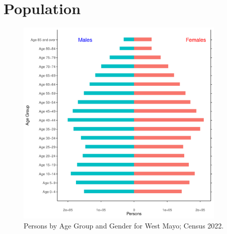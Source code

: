 \documentclass{article}
\begin{document}
\pagebreak

\section{Population} 
\label{sect:Pop}

\begin{figure}[h]
	\centering
	\includegraphics[width = 100mm]{../figures/PyramidPlot.pdf}
	\caption{Persons by Age Group and Gender for West Mayo; Census 2022.}
	\label{fig:2ae19629-1a6a-13a3-e055-000000000001}
	\end{figure}
\end{document}
